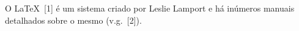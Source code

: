 O {\LaTeX}~[1] é um sistema criado por Leslie
Lamport e há inúmeros manuais detalhados sobre o mesmo
(v.g.~[2]).
